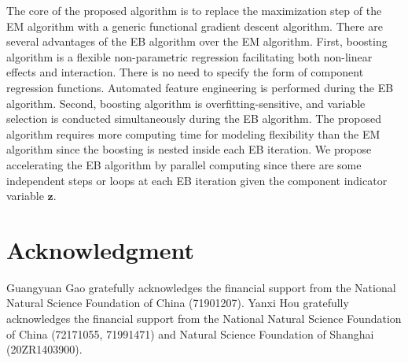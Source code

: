 \documentclass[11pt]{article}
\numberwithin{equation}{section}
\def\bz{\boldsymbol{z}}
\begin{document}
The core of the proposed algorithm is to replace the maximization step of the EM algorithm with a generic functional gradient descent algorithm.
There are several advantages of the EB algorithm over the EM algorithm. 
First, boosting algorithm is a flexible non-parametric regression facilitating both {non-linear effects and interaction}.  
There is no need to specify the form of component regression functions.
Automated feature engineering is performed during the EB algorithm.
Second, boosting algorithm is {overfitting-sensitive}, and {variable selection} is conducted simultaneously during the EB algorithm.
The proposed algorithm requires more computing time for modeling flexibility than the EM algorithm since the boosting is nested inside each EB iteration.
We propose accelerating the EB algorithm by parallel computing since there are some independent steps or loops at each EB iteration given the component indicator variable $\bz$.

	\section*{Acknowledgment}
Guangyuan Gao gratefully acknowledges the financial support from the National Natural Science Foundation of China (71901207). Yanxi Hou gratefully acknowledges the financial support from the National Natural Science Foundation of China (72171055, 71991471) and Natural Science Foundation of Shanghai (20ZR1403900).



\end{document}
